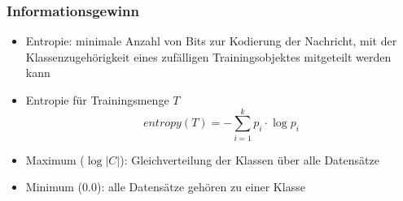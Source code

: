 






\begin{frame}
\frametitle{Informationsgewinn}

\begin{itemize}
\item Entropie: minimale Anzahl von Bits zur Kodierung der Nachricht,
  mit der Klassenzugehörigkeit eines zufälligen Trainingsobjektes
  mitgeteilt werden kann
\item Entropie für Trainingsmenge $T$
$$
\textit{entropy}(T)=-\sum_{i=1}^k p_i \cdot \log p_i
$$
\item Maximum ($\log |C|$): Gleichverteilung der Klassen über
  alle Datensätze 
\item Minimum ($0.0$): alle Datensätze gehören zu einer Klasse
\end{itemize}

\end{frame}


